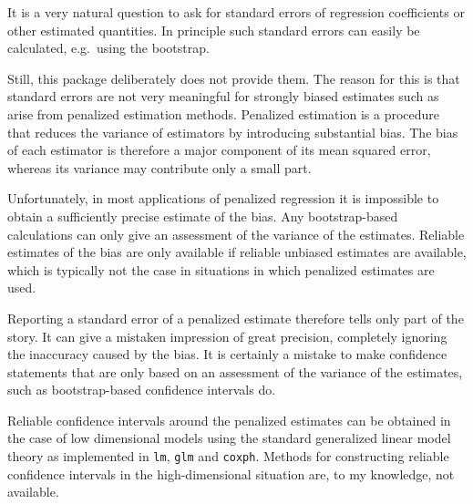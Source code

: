 \documentclass[a4paper]{article}
\newcommand{\Rfunction}[1]{{\texttt{#1}}}
\begin{document}
It is a very natural question to ask for standard errors of regression coefficients or other estimated quantities. In principle such standard errors can easily be calculated, e.g.\ using the bootstrap.

Still, this package deliberately does not provide them. The reason for this is that standard errors are not very meaningful for strongly biased estimates such as arise from penalized estimation methods. Penalized estimation is a procedure that reduces the variance of estimators by introducing substantial bias. The bias of each estimator is therefore a major component of its mean squared error, whereas its variance may contribute only a small part.

Unfortunately, in most applications of penalized regression it is impossible to obtain a sufficiently precise estimate of the bias. Any bootstrap-based calculations can only give an assessment of the variance of the estimates. Reliable estimates of the bias are only available if reliable unbiased estimates are available, which is typically not the case in situations in which penalized estimates are used.

Reporting a standard error of a penalized estimate therefore tells only part of the story. It can give a mistaken impression of great precision, completely ignoring the inaccuracy caused by the bias. It is certainly a mistake to make confidence statements that are only based on an assessment of the variance of the estimates, such as bootstrap-based confidence intervals do.

Reliable confidence intervals around the penalized estimates can be obtained in the case of low dimensional models using the standard generalized linear model theory as implemented in \Rfunction{lm}, \Rfunction{glm} and \Rfunction{coxph}. Methods for constructing reliable confidence intervals in the high-dimensional situation are, to my knowledge, not available.



\end{document}
